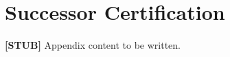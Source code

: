 \chapter{Successor Certification}
\label{appe-successor-certification}

\textbf{[STUB]} Appendix content to be written.
